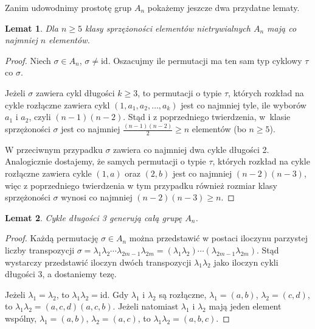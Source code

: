 \documentclass[licencjacka]{pracamgr}
\newtheorem{lemma}{Lemat}[section]
\begin{document}
Zanim udowodnimy prostotę grup $A_n$ pokażemy jeszcze dwa przydatne lematy.

\begin{lemma}\label{lemma_big_con}
    Dla $n \ge 5$ klasy sprzężoności elementów nietrywialnych $A_n$ mają co najmniej $n$ elementów.
\end{lemma}
\begin{proof}
    Niech $\sigma \in A_n$, $\sigma \ne \mathrm{id}$.
    Oszacujmy ile permutacji ma ten sam typ cyklowy $\tau$ co $\sigma$.

    Jeżeli $\sigma$ zawiera cykl długości $k \ge 3$, to permutacji o typie $\tau$, których rozkład na cykle rozłączne zawiera cykl $(1, a_1, a_2, \ldots, a_k)$
    jest co najmniej tyle, ile wyborów $a_1$ i $a_2$, czyli $(n-1)(n-2)$.
    Stąd i z poprzedniego twierdzenia, w~klasie sprzężoności $\sigma$ jest co najmniej $\frac{(n-1)(n-2)}{2} \ge n$ elementów (bo $n \ge 5$).

    W przeciwnym przypadku $\sigma$ zawiera co najmniej dwa cykle długości 2.
    Analogicznie dostajemy, że samych permutacji o typie $\tau$, których rozkład na cykle rozłączne zawiera cykle $(1, a)$ oraz $(2, b)$
    jest co najmniej $(n-2)(n-3)$,
    więc z poprzedniego twierdzenia w tym przypadku również rozmiar klasy sprzężoności $\sigma$ wynosi co najmniej $(n-2)(n-3) \ge n$.
\end{proof}



\begin{lemma}\label{lemma_3cycles}
    Cykle długości 3 generują całą grupę $A_n$.
\end{lemma}
\begin{proof}
    Każdą permutację  $\sigma \in A_n$ można przedstawić w postaci iloczynu parzystej liczby transpozycji
    $\sigma = \lambda_1 \lambda_2 \cdots \lambda_{2m-1} \lambda_{2m} = (\lambda_1 \lambda_2) \cdots (\lambda_{2m-1} \lambda_{2m})$.
    Stąd wystarczy przedstawić iloczyn dwóch transpozycji $\lambda_1 \lambda_2$ jako iloczyn cykli długości 3, a dostaniemy tezę.

    Jeżeli $\lambda_1 = \lambda_2$, to $\lambda_1 \lambda_2 = \mathrm{id}$.
    Gdy $\lambda_1$ i $\lambda_2$ są rozłączne, $\lambda_1 = (a, b)$, $\lambda_2 = (c, d)$, to $\lambda_1 \lambda_2 = (a, c, d)(a, c, b)$.
    Jeżeli natomiast $\lambda_1$ i $\lambda_2$ mają jeden element wspólny,
    $\lambda_1 = (a, b)$, $\lambda_2 = (a, c)$, to $\lambda_1 \lambda_2 = (a, b, c)$.
\end{proof}
\end{document}
